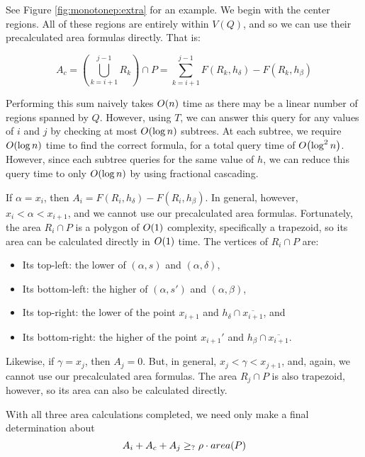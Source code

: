 See Figure \ref{fig:monotonep:extra} for an example. We begin with the center regions. All of these regions are entirely within $V(Q)$, and so we can use their precalculated area formulas directly. That is:

\[
A_c
= \left ( \bigcup_{k=i+1}^{j-1}{R_k} \right ) \cap P 
= \sum_{k=i+1}^{j-1} F(R_k, h_\delta) - F(R_k, h_\beta)
\]

Performing this sum naively takes $O\!\left(n\right)$ time as there may be a linear number of regions spanned by $Q$.  However, using $T$, we can answer this query for any values of $i$ and $j$ by checking at most $O\!\left(\log{n}\right)$ subtrees. At each subtree, we require $O\!\left(\log{n}\right)$ time to find the correct formula, for a total query time of $O\!\left(\log^2{n}\right)$.  However, since each subtree queries for the same value of $h$, we can reduce this query time to only $O\!\left(\log{n}\right)$ by using fractional cascading.\cite{cg-fc-86, cg-fc2-86}

If $\alpha = x_i$, then $A_i = F(R_i, h_\delta) - F(R_i, h_\beta)$. In general, however, $x_i < \alpha < x_{i+1}$, and we cannot use our precalculated area formulas. Fortunately, the area $R_i \cap P$ is a polygon of $O\!\left(1\right)$ complexity, specifically a trapezoid, so its area can be calculated directly in $O\!\left(1\right)$ time. The vertices of $R_i \cap P$ are:
\begin{itemize}
 \item Its top-left: the lower of $(\alpha, s)$ and $(\alpha, \delta)$,

 \item Its bottom-left: the higher of $(\alpha, s')$ and $(\alpha, \beta)$,

 \item Its top-right: the lower of the point $x_{i+1}$ and  $h_\delta \cap \overline{x_{i+1}}$, and

 \item Its bottom-right: the higher of the point $x_{i+1}'$ and $h_\beta \cap \overline{x_{i+1}}$.

\end{itemize}

Likewise, if $\gamma = x_j$, then $A_j = 0$. But, in general, $x_j < \gamma < x_{j+1}$, and, again, we cannot use our precalculated area formulas. The area $R_j \cap P$ is also trapezoid, however, so its area can also be calculated directly.

With all three area calculations completed, we need only make a final determination about 
\[
A_i + A_c + A_j \geq_? \rho \cdot area(P)
\]

